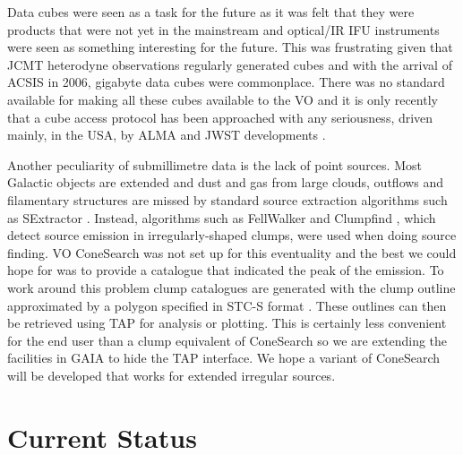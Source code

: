 \documentclass[final,authoryear,5p,times,twocolumn]{elsarticle}
\begin{document}
Data cubes were seen as a task for the future as it was
felt that they were products that were not yet in the mainstream and
optical/IR IFU instruments \citep[such as
UIST;][]{2004SPIE.5492.1160R} were seen as something interesting for
the future. This was frustrating given that JCMT heterodyne
observations regularly generated cubes and with the arrival of ACSIS
in 2006, gigabyte data cubes were commonplace. There was no standard
available for making all these cubes available to the VO and it is
only recently \citep[e.g.,][]{2014AAS...22325505T} that a cube access
protocol has been approached with any seriousness, driven mainly, in
the USA, by ALMA and JWST developments \citep[e.g.,
MIRI;][]{2010SPIE.7731E..10W}.

Another peculiarity of submillimetre data is the lack of point
sources. Most Galactic objects are extended and dust and gas from
large clouds, outflows and filamentary structures are missed by
standard source extraction algorithms such as SExtractor
\citep[][]{1996A&AS..117..393B}. Instead, algorithms
such as FellWalker \citep[][]{2007ASPC..376..425B} and
Clumpfind \citep[][]{1994ApJ...428..693W}, which detect
source emission in irregularly-shaped clumps, were used when
doing source finding. VO ConeSearch was not
set up for this eventuality and the best we could hope for was to
provide a catalogue that indicated the peak of the emission. To work
around this problem clump catalogues are generated with the clump
outline approximated by a polygon specified in STC-S format
\citep{2010ASPC..434..213B}. These outlines can then be retrieved
using TAP for analysis or plotting. This is certainly less convenient
for the end user than a clump equivalent of ConeSearch so we are
extending the facilities in GAIA
\citep[][]{2009ASPC..411..575D} to hide the TAP
interface. We hope a variant of ConeSearch will be developed that
works for extended irregular sources.

\section{Current Status}
\end{document}
